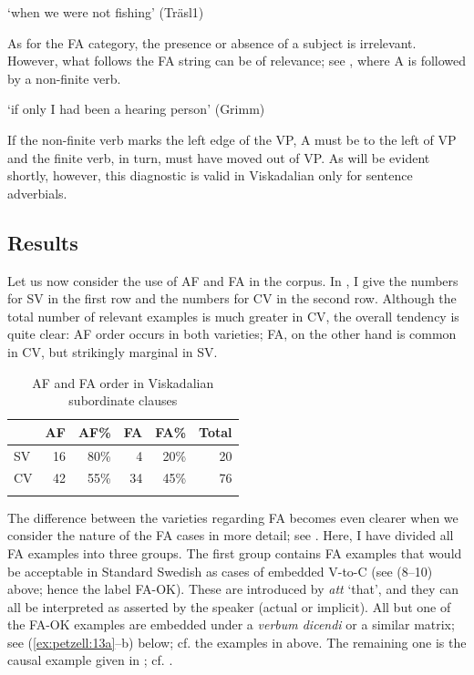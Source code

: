 \documentclass[output=paper,colorlinks,citecolor=brown,draft,draftmode]{langscibook}
\begin{document}
\glt `when we were not fishing’ (Träsl1)
\z

As for the FA category, the presence or absence of a subject is irrelevant. However, what follows the FA string can be of relevance; see , where A is followed by a non-finite verb.


\glt `if only I had been a hearing person’ (Grimm)
\z


If the non-finite verb marks the left edge of the VP, A must be to the left of VP and the finite verb, in turn, must have moved out of VP. As will be evident shortly, however, this diagnostic is valid in Viskadalian only for sentence adverbials.


\subsection{Results}\label{sec:petzell:2.4}


Let us now consider the use of AF and FA in the corpus. In , I give the numbers for SV in the first row and the numbers for CV in the second row. Although the total number of relevant examples is much greater in CV, the overall tendency is quite clear: AF order occurs in both varieties; FA, on the other hand is common in CV, but strikingly marginal in SV.


\begin{table}
\begin{tabular}{lrrrrr}
\lsptoprule
& AF & AF\% & FA & FA\% & Total\\\midrule
SV & 16 & 80\% & 4 & 20\% & 20\\
CV & 42 & 55\% & 34 & 45\% & 76\\
\lspbottomrule
\end{tabular}
\caption{\label{tab:petzell:1a}AF and FA order in Viskadalian subordinate clauses}
\end{table}



The difference between the varieties regarding FA becomes even clearer when we consider the nature of the FA cases in more detail; see . Here, I have divided all FA examples into three groups. The first group contains FA examples that would be acceptable in Standard Swedish as cases of embedded V-to-C (see (8–10) above; hence the label FA-OK). These are introduced by \textit{att} ‘that’, and they can all be interpreted as asserted by the speaker (actual or implicit). All but one of the FA-OK examples are embedded under a \textit{verbum dicendi} or a similar matrix; see (\ref{ex:petzell:13a}–b) below; cf. the examples in  above. The remaining one is the causal example given in ; cf. .
\end{document}
